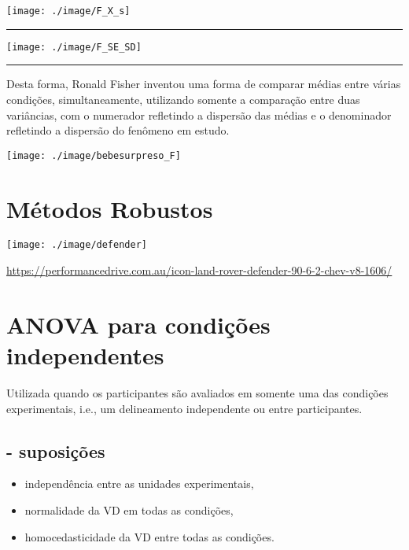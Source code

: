 \documentclass[]{article}
\providecommand{\tightlist}{%
  \setlength{\itemsep}{0pt}\setlength{\parskip}{0pt}}
\begin{document}
\begin{center}\texttt{[image: ./image/F\_X\_s]} \end{center}

\begin{center}\rule{0.5\linewidth}{\linethickness}\end{center}

\begin{center}\texttt{[image: ./image/F\_SE\_SD]} \end{center}

\begin{center}\rule{0.5\linewidth}{\linethickness}\end{center}

Desta forma, Ronald Fisher inventou uma forma de comparar médias entre
várias condições, simultaneamente, utilizando somente a comparação entre
duas variâncias, com o numerador refletindo a dispersão das médias e o
denominador refletindo a dispersão do fenômeno em estudo.

\begin{center}\texttt{[image: ./image/bebesurpreso\_F]} \end{center}

\section{Métodos Robustos}\label{metodos-robustos}

\begin{center}\texttt{[image: ./image/defender]} \end{center}

\url{https://performancedrive.com.au/icon-land-rover-defender-90-6-2-chev-v8-1606/}

\section{ANOVA para condições
independentes}\label{anova-para-condicoes-independentes}

Utilizada quando os participantes são avaliados em somente uma das
condições experimentais, i.e., um delineamento independente ou entre
participantes.

\subsection{- suposições}\label{suposicoes}

\begin{itemize}
\tightlist
\item
  independência entre as unidades experimentais,
\item
  normalidade da VD em todas as condições,
\item
  homocedasticidade da VD entre todas as condições.
\end{itemize}
\end{document}
